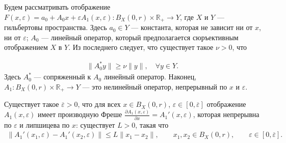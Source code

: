 \documentclass[../main.tex]{subfiles}
\begin{document}
Будем рассматривать отображение $F(x, \varepsilon) = a_0 + A_0x + \varepsilon A_1(x,\varepsilon): B_X(0, r) \times \mathbb{R}_+ \rightarrow Y$, где $X$ и $Y$ --- гильбертовы пространства.
Здесь $a_0 \in Y$ --- константа, которая не зависит ни от $x$, ни от $\varepsilon$; $A_0$ --- линейный оператор, который предполагается сюръективным отображением $X$ в $Y$. 
Из последнего следует, что существует такое $\nu > 0$, что

\begin{gather}\label{regular}
 \| A_0^*y\| \geqslant \nu \|y\|, \quad \forall y \in Y.
\end{gather}
Здесь $A_0^* $ --- сопряженный к $A_0$ линейный оператор.
Наконец, $A_1: B_X(0, r) \times \mathbb{R}_+ \to Y $ --- это нелинейный оператор, непрерывный по $x$ и $\varepsilon$.
\begin{assumption}\label{as:derivative_of_A1}
 Существует такое $\overline{\varepsilon} > 0$, что для всех $x \in B_X(0,r)$, $\varepsilon \in [0, \overline{\varepsilon}]$ отображение $A_1(x, \varepsilon)$ имеет производную Фреше $\frac{\partial A_1(x, \varepsilon)}{\partial x} = A_1'(x, \varepsilon)$, которая непрерывна по $\varepsilon$ и липшицева по $x$: существует $L>0$, такая что
 \begin{gather*}
 \|A_1'(x_1,\varepsilon) - A_1'(x_2,\varepsilon) \| \leqslant L\|x_1-x_2\|, \qquad x_1, x_2 \in B_X(0,r), \qquad \varepsilon \in [0, \overline{\varepsilon}].
 \end{gather*}
\end{assumption}
\end{document}
